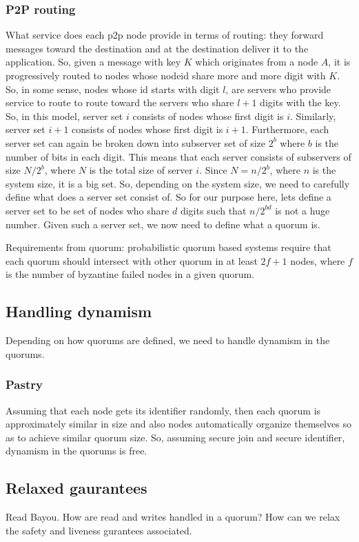\subsubsection{P2P routing} 
What service does each p2p node provide in terms of routing: they forward messages toward the destination and at the destination deliver it to the application.  
So, given a message with key $K$ which originates from a node $A$, it is progressively routed to nodes whose nodeid share more and more digit with $K$. So, in some sense, nodes whose id starts with digit $l$, are servers who provide service to route to route toward the servers who share $l+1$ digits with the key. So, in this model, server set $i$ consists of nodes whose first digit is $i$. Similarly, server set $i+1$ consists of nodes whose first digit is $i+1$. Furthermore, each server set can again be broken down into subserver set of size $2^b$ where $b$ is the number of bits in each digit. This means that each server consists of subservers of size $N/2^b$, where $N$ is the total size of server $i$. Since $N=n/2^b$, where $n$ is the system size, it is a big set. So, depending on the system size, we need to carefully define what does a server set consist of. So for our purpose here, lets define a server set to be set of nodes who share $d$ digits such that $n/2^{bd}$ is not a huge number. Given such a server set, we now need to define what a quorum is.  
 
Requirements from quorum: probabilistic quorum based systems require that each quorum should intersect with other quorum in at least $2f+1$ nodes, where $f$ is the number of byzantine failed nodes in a given quorum. 
 
 
\subsection{Handling dynamism} 
Depending on how quorums are defined, we need to handle dynamism in the quorums.  
\subsubsection{Pastry} 
Assuming that each node gets its identifier randomly, then each quorum is approximately similar in size and also nodes automatically organize themselves so as to achieve similar quorum size. So, assuming secure join and secure identifier, dynamism in the quorums is free. 
 
 
\subsection{Relaxed gaurantees} Read Bayou. How are read and writes handled in a quorum? How can we relax the safety and liveness gurantees associated. 
 
